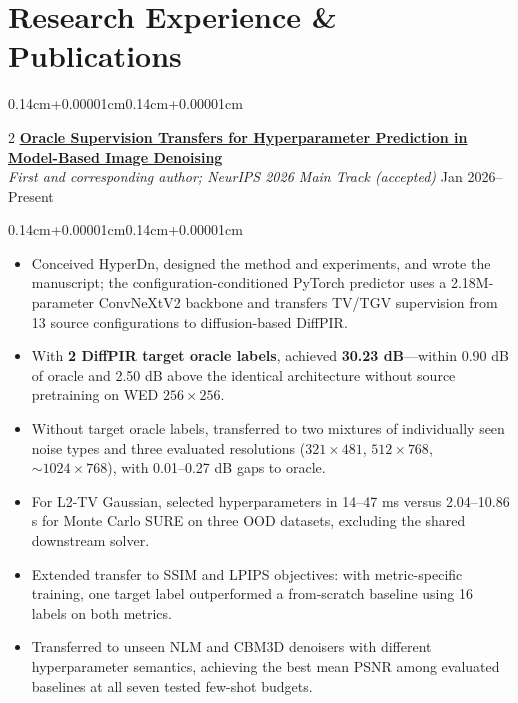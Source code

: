\documentclass[10pt,letterpaper]{article}
\newenvironment{highlights}{\begin{itemize}[label=\textcolor{primaryColor}{\small\textbullet},topsep=0.10cm,parsep=0pt,partopsep=0pt,itemsep=0.04cm,leftmargin=0.44cm+10pt]}{\end{itemize}}
\newenvironment{onecolentry}{\begin{adjustwidth}{0.14cm+0.00001cm}{0.14cm+0.00001cm}\raggedright}{\end{adjustwidth}}
\newenvironment{twocolentry}[2][]{\onecolentry\def\secondColumn{\fontsize{9.8pt}{11.2pt}\selectfont\color{mutedColor}#2}\setcolumnwidth{\fill,3.55cm}\begin{paracol}{2}}{\switchcolumn\raggedleft\secondColumn\end{paracol}\endonecolentry}
\let\hrefWithoutArrow\href
\renewcommand{\href}[2]{\hrefWithoutArrow{#1}{\ifthenelse{\equal{#2}{}}{ }{#2\,\raisebox{.15ex}{\scriptsize\faExternalLink*}}}}
\begin{document}
\section{Research Experience \& Publications}

\begin{twocolentry}{Jan 2026--Present}
  \textbf{\hrefWithoutArrow{https://arxiv.org/abs/2605.20479}{\textcolor{bodyColor}{Oracle Supervision Transfers for Hyperparameter Prediction in Model-Based Image Denoising}}}\\
  \textit{\color{mutedColor}First and corresponding author; NeurIPS 2026 Main Track (accepted)}
\end{twocolentry}
\begin{onecolentry}
\begin{highlights}
  \item Conceived HyperDn, designed the method and experiments, and wrote the manuscript; the configuration-conditioned PyTorch predictor uses a 2.18M-parameter ConvNeXtV2 backbone and transfers TV/TGV supervision from 13 source configurations to diffusion-based DiffPIR.
  \item With \textbf{2 DiffPIR target oracle labels}, achieved \textbf{30.23 dB}---within 0.90 dB of oracle and 2.50 dB above the identical architecture without source pretraining on WED $256\times256$.
  \item Without target oracle labels, transferred to two mixtures of individually seen noise types and three evaluated resolutions ($321\times481$, $512\times768$, $\sim\!1024\times768$), with 0.01--0.27 dB gaps to oracle.
  \item For L2-TV Gaussian, selected hyperparameters in 14--47 ms versus 2.04--10.86 s for Monte Carlo SURE on three OOD datasets, excluding the shared downstream solver.
  \item Extended transfer to SSIM and LPIPS objectives: with metric-specific training, one target label outperformed a from-scratch baseline using 16 labels on both metrics.
  \item Transferred to unseen NLM and CBM3D denoisers with different hyperparameter semantics, achieving the best mean PSNR among evaluated baselines at all seven tested few-shot budgets.
\end{highlights}
\end{onecolentry}
\vspace{0.11cm}
\end{document}
